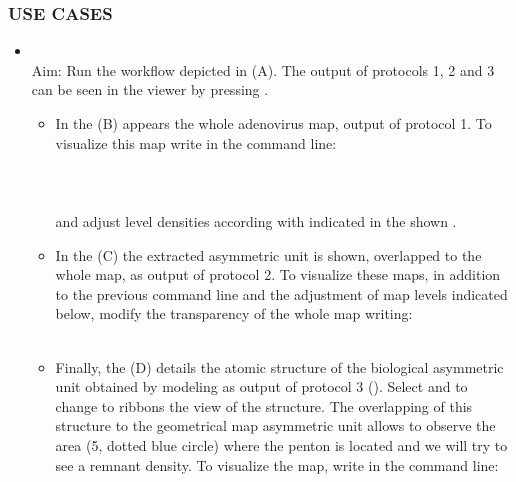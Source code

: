\subsubsection*{USE CASES}
\begin{itemize}
                \item {}\\
                Aim: Run the \scipion workflow depicted in  (A). The output of protocols 1, 2 and 3 can be seen in the \chimera viewer by pressing .
                \begin{itemize}
                        \item In the  (B) appears the whole adenovirus map, output of protocol 1. To visualize this map write in the \chimera command line:\\
                        \\
                        \\
                        \\
                        and adjust level densities according with indicated in the shown .
                        \item In the  (C) the extracted asymmetric unit is shown, overlapped to the whole map, as output of protocol 2. To visualize these maps, in addition to the previous \chimera command line and the adjustment of map levels indicated below, modify the transparency of the whole map writing:\\
                        \\
                        \item Finally, the  (D) details the atomic structure of the biological asymmetric unit obtained by modeling as output of protocol 3 (). Select  and  to change to ribbons the view of the structure. The overlapping of this structure to the geometrical map asymmetric unit allows to observe the area (5, dotted blue circle) where the penton is located and we will try to see a remnant density. To visualize the map, write in the command line:\\
                        \\
                \end{itemize}


\end{itemize}
